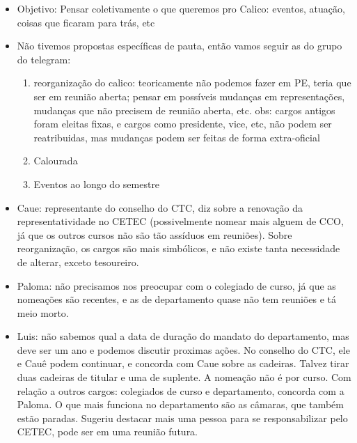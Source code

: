 \documentclass{ata-calico}
\begin{document}
\maketitle


\begin{itemize}

\item Objetivo: Pensar coletivamente o que queremos pro Calico: eventos, atuação, coisas que ficaram para trás, etc

\item Não tivemos propostas específicas de pauta, então vamos seguir as do grupo do telegram:
\begin{enumerate}
\item reorganização do calico: teoricamente não podemos fazer em PE, teria que ser em reunião aberta; 
    pensar em possíveis mudanças em representações, mudanças que não precisem de reunião aberta, etc.
    obs: cargos antigos foram eleitas fixas, e cargos como presidente, vice, etc, não podem ser reatribuidas, mas
    mudanças podem ser feitas de forma extra-oficial
\item Calourada
\item Eventos ao longo do semestre
\end{enumerate}
\item Caue: representante do conselho do CTC, diz sobre a renovação da representatividade no CETEC (possivelmente nomear mais alguem de CCO, já que os outros cursos não são tão assíduos em reuniões). Sobre reorganização, os cargos são mais simbólicos, e não existe tanta necessidade de alterar, exceto tesoureiro.

\item  Paloma: não precisamos nos preocupar com o colegiado de curso, já que as nomeações são recentes, e as de departamento quase não tem reuniões e tá meio morto.

\item Luis: não sabemos qual a data de duração do mandato do departamento, mas deve ser um ano e podemos discutir proximas ações.
No conselho do CTC, ele e Cauê podem continuar, e concorda com Caue sobre as cadeiras. Talvez tirar duas cadeiras de titular e uma de suplente. A nomeação não é por curso.  Com relação a outros cargos: colegiados de curso e departamento, concorda com a Paloma. O que mais funciona no departamento são as
câmaras, que também estão paradas. Sugeriu destacar mais uma pessoa para se responsabilizar pelo CETEC, pode ser em uma reunião futura.


\end{itemize}
\end{document}
